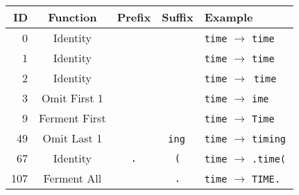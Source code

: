 \newcommand{\ttspace}{\texttt{\textvisiblespace}}
\begin{tabular}{r|c|c|c|l}
	ID  & Function      & Prefix   & Suffix               & Example                                                   \\ \hline
	0   & Identity      &          &                      & \verb|time| $\rightarrow$ \verb|time|                     \\
	1   & Identity      &          & \ttspace             & \verb|time| $\rightarrow$ \verb|time|\,\ttspace           \\
	2   & Identity      & \ttspace & \ttspace             & \verb|time| $\rightarrow$ \ttspace\,\verb|time|\,\ttspace \\
	3   & Omit First 1  &          &                      & \verb|time| $\rightarrow$ \verb|ime|                      \\
	9   & Ferment First &          &                      & \verb|time| $\rightarrow$ \verb|Time|                     \\
	49  & Omit Last 1   &          & \verb|ing|\,\ttspace & \verb|time| $\rightarrow$ \verb|timing|\,\ttspace         \\
	67  & Identity      & \verb|.| & \verb|(|             & \verb|time| $\rightarrow$ \verb|.time(|                   \\
	107 & Ferment All   &          & \verb|.|             & \verb|time| $\rightarrow$ \verb|TIME.|
\end{tabular}